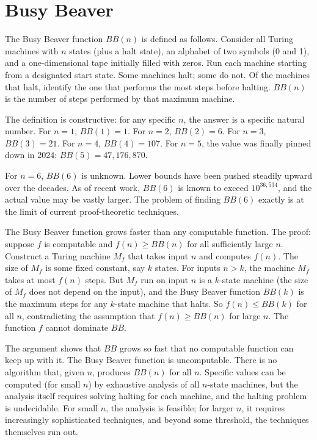 \section{Busy Beaver}
\label{se:busy-beaver}

The Busy Beaver function $BB(n)$ is defined as follows. Consider all
Turing machines with $n$ states (plus a halt state), an alphabet of two
symbols (0 and 1), and a one-dimensional tape initially filled with
zeros. Run each machine starting from a designated start state. Some
machines halt; some do not. Of the machines that halt, identify the one
that performs the most steps before halting. $BB(n)$ is the number of
steps performed by that maximum machine.

The definition is constructive: for any specific $n$, the answer is a
specific natural number. For $n = 1$, $BB(1) = 1$. For $n = 2$,
$BB(2) = 6$. For $n = 3$, $BB(3) = 21$. For $n = 4$, $BB(4) = 107$. For
$n = 5$, the value was finally pinned down in 2024: $BB(5) =
47{,}176{,}870$.

For $n = 6$, $BB(6)$ is unknown. Lower bounds have been pushed steadily
upward over the decades. As of recent work, $BB(6)$ is known to exceed
$10^{36{,}534}$, and the actual value may be vastly larger. The problem
of finding $BB(6)$ exactly is at the limit of current proof-theoretic
techniques.

The Busy Beaver function grows faster than any computable function. The
proof: suppose $f$ is computable and $f(n) \ge BB(n)$ for all
sufficiently large $n$. Construct a Turing machine $M_f$ that takes
input $n$ and computes $f(n)$. The size of $M_f$ is some fixed
constant, say $k$ states. For inputs $n > k$, the machine $M_f$ takes
at most $f(n)$ steps. But $M_f$ run on input $n$ is a $k$-state
machine (the size of $M_f$ does not depend on the input), and the
Busy Beaver function $BB(k)$ is the maximum steps for any $k$-state
machine that halts. So $f(n) \le BB(k)$ for all $n$, contradicting
the assumption that $f(n) \ge BB(n)$ for large $n$. The function $f$
cannot dominate $BB$.

The argument shows that $BB$ grows so fast that no computable
function can keep up with it. The Busy Beaver function is
uncomputable. There is no algorithm that, given $n$, produces $BB(n)$
for all $n$. Specific values can be computed (for small $n$) by
exhaustive analysis of all $n$-state machines, but the analysis itself
requires solving halting for each machine, and the halting problem is
undecidable. For small $n$, the analysis is feasible; for larger $n$,
it requires increasingly sophisticated techniques, and beyond some
threshold, the techniques themselves run out.

